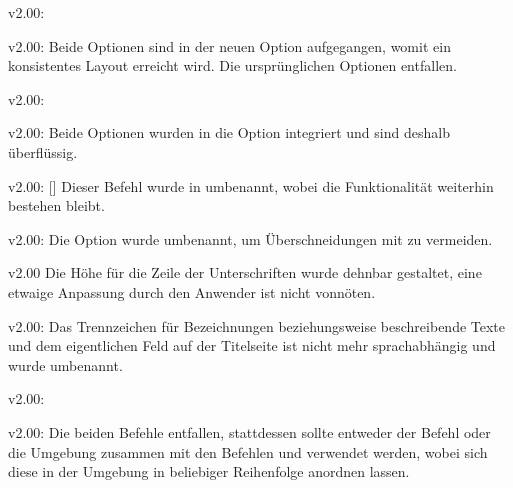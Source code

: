 \begin{Cessation}{v2.00:}{%
}
\begin{Cessation}{v2.00:}{%
}
\printobsoletelist%
%
Beide Optionen sind in der neuen Option  
aufgegangen, womit ein konsistentes Layout erreicht wird. Die ursprünglichen 
Optionen entfallen. 
\end{Cessation}
\end{Cessation}

\begin{Cessation}{v2.00:}{}
\begin{Cessation}{v2.00:}{}
\printobsoletelist%
%
Beide Optionen wurden in die Option  integriert und sind 
deshalb überflüssig.
\end{Cessation}
\end{Cessation}

\begin{Cessation}{v2.00:}{%
  []%
}
\printobsoletelist%
%
Dieser Befehl wurde in  umbenannt, wobei die Funktionalität 
weiterhin bestehen bleibt.
\end{Cessation}

\begin{Cessation}{v2.00:}{}
\printobsoletelist%
%
Die Option wurde umbenannt, um Überschneidungen mit  zu 
vermeiden.
\end{Cessation}

\begin{Cessation}{v2.00}{}
\printobsoletelist%
%
Die Höhe für die Zeile der Unterschriften wurde dehnbar gestaltet, eine etwaige 
Anpassung durch den Anwender ist nicht vonnöten.
\end{Cessation}

\begin{Cessation}{v2.00:}{}%
\printobsoletelist%
%
Das Trennzeichen für Bezeichnungen beziehungsweise beschreibende Texte und dem 
eigentlichen Feld auf der Titelseite ist nicht mehr sprachabhängig und wurde 
umbenannt.
\end{Cessation}

\begin{Cessation}{v2.00:}{}
\begin{Cessation}{v2.00:}{}
\printobsoletelist%
%
Die beiden Befehle entfallen, stattdessen sollte entweder der Befehl 
 oder die Umgebung  zusammen mit 
den Befehlen  und  verwendet werden, 
wobei sich diese in der Umgebung in beliebiger Reihenfolge anordnen lassen.
\end{Cessation}
\end{Cessation}

